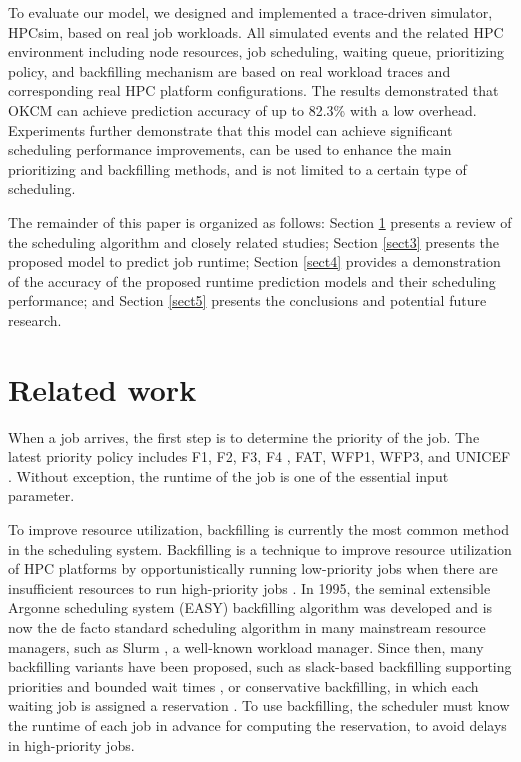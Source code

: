 \documentclass[a4paper,fleqn]{cas-sc}
\begin{document}
To evaluate our model, we designed and implemented a trace-driven simulator, HPCsim, based on real job workloads. All simulated events and the related HPC environment including node resources, job scheduling, waiting queue, prioritizing policy, and backfilling mechanism are based on real workload traces and corresponding real HPC platform configurations. The results demonstrated that OKCM can achieve prediction accuracy of up to 82.3\% with a low overhead. Experiments further demonstrate that this model can achieve significant scheduling performance improvements, can be used to enhance the main prioritizing and backfilling methods, and is not limited to a certain type of scheduling.

The remainder of this paper is organized as follows: Section \ref{sect2} presents a review of the scheduling algorithm and closely related studies; Section \ref{sect3} presents the proposed model to predict job runtime; Section \ref{sect4} provides a demonstration of the accuracy of the proposed runtime prediction models and their scheduling performance; and Section \ref{sect5} presents the conclusions and potential future research.


\section{Related work} \label{sect2}
When a job arrives, the first step is to determine the priority of the job. The latest priority policy includes F1, F2, F3, F4 \cite{4SC17}, FAT, WFP1, WFP3, and UNICEF \cite{5Cluster09}. Without exception, the runtime of the job is one of the essential input parameter. 

To improve resource utilization, backfilling is currently the most common method in the scheduling system. Backfilling is a technique to improve resource utilization of HPC platforms by opportunistically running low-priority jobs when there are insufficient resources to run high-priority jobs \cite{11JSSPP}. In 1995, the seminal extensible Argonne scheduling system (EASY) backfilling algorithm \cite{12EASY} was developed and is now the de facto standard scheduling algorithm in many mainstream resource managers, such as Slurm \cite{13Slurm}, a well-known workload manager. Since then, many backfilling variants have been proposed, such as slack-based backfilling supporting priorities and bounded wait times \cite{14Prio}, or conservative backfilling, in which each waiting job is assigned a reservation \cite{15Utili}. To use backfilling, the scheduler must know the runtime of each job in advance for computing the reservation, to avoid delays in high-priority jobs. 
\end{document}
